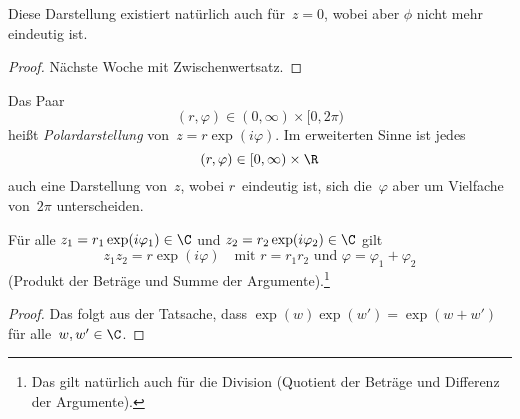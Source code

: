 \documentclass[a4paper]{article}
\begin{document}
Diese Darstellung existiert natürlich auch für~$z = 0$, wobei aber $\phi$ nicht mehr eindeutig ist.

\begin{proof}
    Nächste Woche mit Zwischenwertsatz.
\end{proof}

\begin{notation}[Polardarstellung]
    Das Paar
    \begin{equation*}
        (r,\varphi) \in (0,\infty) \times [0, 2\pi)
    \end{equation*}
    heißt \emph{Polardarstellung} von~$z = r\exp(i\varphi)$. Im erweiterten Sinne ist jedes
    \begin{equation*}
        (r,\varphi) \in [0,\infty) \times \R
    \end{equation*}
    auch eine Darstellung von~$z$, wobei $r$~eindeutig ist, sich die~$\varphi$ aber um Vielfache von~$2\pi$ unterscheiden.
\end{notation}

\begin{corollary}
    Für alle $z_1 = r_1\exp(i\varphi_1) \in \C$ und $z_2 = r_2\exp(i\varphi_2) \in \C$ gilt
    \begin{equation*}
        z_1z_2 = r\exp(i\varphi) \quad\text{mit } r = r_1r_2 \text{ und } \varphi = \varphi_1+\varphi_2
    \end{equation*}
    (Produkt der Beträge und Summe der Argumente).\footnote{Das gilt natürlich auch für die Division (Quotient der Beträge und Differenz der Argumente).}
\end{corollary}

\begin{proof}
    Das folgt aus der Tatsache, dass $\exp(w) \exp(w') = \exp(w+w')$ für alle~$w,w' \in \C$.
\end{proof}

\begin{center}
\end{center}
\end{document}

